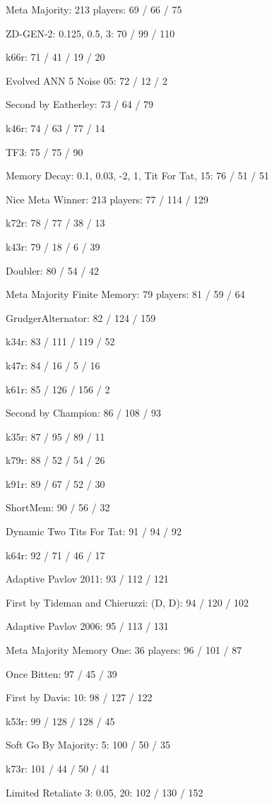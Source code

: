 \item Meta Majority: 213 players: 69 / 66 / 75
\item ZD-GEN-2: 0.125, 0.5, 3: 70 / 99 / 110
\item k66r: 71 / 41 / 19 / 20
\item Evolved ANN 5 Noise 05: 72 / 12 / 2
\item Second by Eatherley: 73 / 64 / 79
\item k46r: 74 / 63 / 77 / 14
\item TF3: 75 / 75 / 90
\item Memory Decay: 0.1, 0.03, -2, 1, Tit For Tat, 15: 76 / 51 / 51
\item Nice Meta Winner: 213 players: 77 / 114 / 129
\item k72r: 78 / 77 / 38 / 13
\item k43r: 79 / 18 / 6 / 39
\item Doubler: 80 / 54 / 42
\item Meta Majority Finite Memory: 79 players: 81 / 59 / 64
\item GrudgerAlternator: 82 / 124 / 159
\item k34r: 83 / 111 / 119 / 52
\item k47r: 84 / 16 / 5 / 16
\item k61r: 85 / 126 / 156 / 2
\item Second by Champion: 86 / 108 / 93
\item k35r: 87 / 95 / 89 / 11
\item k79r: 88 / 52 / 54 / 26
\item k91r: 89 / 67 / 52 / 30
\item ShortMem: 90 / 56 / 32
\item Dynamic Two Tits For Tat: 91 / 94 / 92
\item k64r: 92 / 71 / 46 / 17
\item Adaptive Pavlov 2011: 93 / 112 / 121
\item First by Tideman and Chieruzzi: (D, D): 94 / 120 / 102
\item Adaptive Pavlov 2006: 95 / 113 / 131
\item Meta Majority Memory One: 36 players: 96 / 101 / 87
\item Once Bitten: 97 / 45 / 39
\item First by Davis: 10: 98 / 127 / 122
\item k53r: 99 / 128 / 128 / 45
\item Soft Go By Majority: 5: 100 / 50 / 35
\item k73r: 101 / 44 / 50 / 41
\item Limited Retaliate 3: 0.05, 20: 102 / 130 / 152
